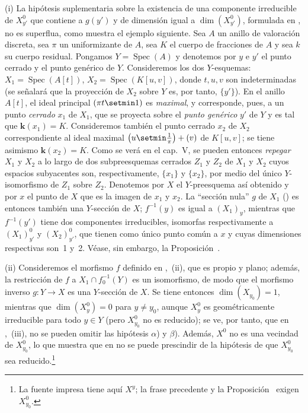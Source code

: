 \begin{remarks}[15.6.10]
\label{IV.15.6.10}
(i)
La hipótesis suplementaria sobre la existencia de una componente irreducible de $X_{y'}^0$ que contiene a $g(y')$ y de dimensión igual a $\dim(X_{y'}^0)$, formulada en , no es superflua, como muestra el ejemplo siguiente.
Sea $A$ un anillo de valoración discreta, sea $\pi$ un uniformizante de $A$, sea $K$ el cuerpo de fracciones de $A$ y sea $k$ su cuerpo residual. Pongamos $Y=\operatorname{Spec}(A)$ y denotemos por $y$ e $y'$ el punto cerrado y el punto genérico de $Y$.
Consideremos los dos $Y$-esquemas: $X_1=\operatorname{Spec}(A[t])$, $X_2=\operatorname{Spec}(K[u,v])$, donde $t,u,v$ son indeterminadas (se señalará que la proyección de $X_2$ sobre $Y$ es, por tanto, $\{y'\}$).
En el anillo $A[t]$, el ideal principal $(\pi t\setmin 1)$ es \emph{maximal}, y corresponde, pues, a un punto \emph{cerrado} $x_1$ de $X_1$, que se proyecta sobre el \emph{punto genérico} $y'$ de $Y$ y es tal que $\boldsymbol{k}(x_1)=K$.
Consideremos también el punto cerrado $x_2$ de $X_2$ correspondiente al ideal maximal $\left(u\setmin\frac{1}{\pi}\right)+(v)$ de $K[u,v]$; se tiene asimismo $\boldsymbol{k}(x_2)=K$.
Como se verá en el cap.\ V, se pueden entonces \emph{repegar} $X_1$ y $X_2$ a lo largo de dos subpreesquemas cerrados $Z_1$ y $Z_2$ de $X_1$ y $X_2$ cuyos espacios subyacentes son, respectivamente, $\{x_1\}$ y $\{x_2\}$, por medio del único $Y$-isomorfismo de $Z_1$ sobre $Z_2$.
Denotemos por $X$ el $Y$-preesquema así obtenido y por $x$ el punto de $X$ que es la imagen de $x_1$ y $x_2$.
La ``sección nula'' $g$ de $X_1$ () es entonces también una $Y$-sección de $X$; $f^{-1}(y)$ es igual a $(X_1)_y$, mientras que $f^{-1}(y')$ tiene dos componentes irreducibles, isomorfas respectivamente a $(X_1)_{y'}^0$ y $(X_2)_{y'}^0$, que tienen como único punto común a $x$ y cuyas dimensiones respectivas son~1 y~2. Véase, sin embargo, la Proposición~.

(ii)
Consideremos el morfismo $f$ definido en ,~(ii), que es propio y plano; además, la restricción de $f$ a $X_1\cap f_0^{-1}(Y)$ es un isomorfismo, de modo que el morfismo inverso $g:Y\to X$ es una $Y$-sección de $X$.
Se tiene entonces $\dim(X_{y_0})=1$, mientras que $\dim(X_y^0)=0$ para $y\ne y_0$, aunque $X_y^0$ es geométricamente irreducible para todo $y\in Y$ (pero $X_{y_0}^0$ no es reducido); se ve, por tanto, que en ,~(iii), no se pueden omitir las hipótesis $\alpha$) y $\beta$).
Además, $X^0$ no es una vecindad de $X_{y_0}^{0}$, lo que muestra que en  no se puede prescindir de la hipótesis de que $X_{y_0}^0$ sea reducido.\footnote{La fuente impresa tiene aquí $X^y$; la frase precedente y la Proposición~ exigen $X_{y_0}^0$.}


\end{remarks}
